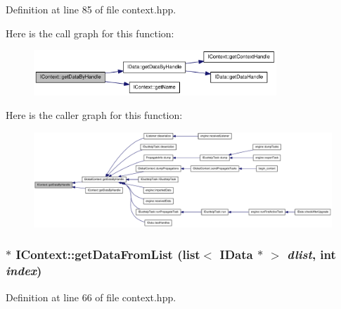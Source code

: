 Definition at line 85 of file context.hpp.

Here is the call graph for this function:\nopagebreak
\begin{figure}[H]
\begin{center}
\leavevmode
\includegraphics[width=259pt]{class_i_context_a9e05e14cdde2f0b5a0ed3349815cb974_cgraph}
\end{center}
\end{figure}


Here is the caller graph for this function:\nopagebreak
\begin{figure}[H]
\begin{center}
\leavevmode
\includegraphics[width=420pt]{class_i_context_a9e05e14cdde2f0b5a0ed3349815cb974_icgraph}
\end{center}
\end{figure}
\hypertarget{class_i_context_a63b80af186cfc16907b72e8fdb3a7f11}{
\subsubsection[{getDataFromList}]{$\ast$ IContext::getDataFromList (list$<$ {\bf IData} $\ast$ $>$ {\em dlist}, \/  int {\em index})}}
\label{class_i_context_a63b80af186cfc16907b72e8fdb3a7f11}


Definition at line 66 of file context.hpp.

